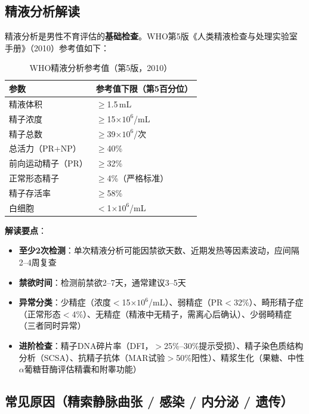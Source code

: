 \subsection{精液分析解读}

精液分析是男性不育评估的\textbf{基础检查}。WHO第5版《人类精液检查与处理实验室手册》（2010）参考值如下：

\begin{table}[htbp]
\centering
\caption{WHO精液分析参考值（第5版，2010）}
\label{tab:semen_analysis_who}
\begin{tabularx}{\textwidth}{@{}lX@{}}
    \toprule
    \textbf{参数} & \textbf{参考值下限（第5百分位）} \\
    \midrule
    精液体积 & $\ge$1.5\,mL \\
    精子浓度 & $\ge$15$\times10^6$/mL \\
    精子总数 & $\ge$39$\times10^6$/次 \\
    总活力（PR+NP） & $\ge$40\% \\
    前向运动精子（PR） & $\ge$32\% \\
    正常形态精子 & $\ge$4\%（严格标准） \\
    精子存活率 & $\ge$58\% \\
    白细胞 & $<$1$\times10^6$/mL \\
    \bottomrule
\end{tabularx}
\end{table}

\textbf{解读要点}：
\begin{itemize}[leftmargin=2cm]
	\item \textbf{至少2次检测}：单次精液分析可能因禁欲天数、近期发热等因素波动，应间隔2--4周复查
	\item \textbf{禁欲时间}：检测前禁欲2--7天，通常建议3--5天
	\item \textbf{异常分类}：少精症（浓度$<$15$\times10^6$/mL）、弱精症（PR$<$32\%）、畸形精子症（正常形态$<$4\%）、无精症（精液中无精子，需离心后确认）、少弱畸精症（三者同时异常）
	\item \textbf{进阶检查}：精子DNA碎片率（DFI，$>$25\%--30\%提示受损）、精子染色质结构分析（SCSA）、抗精子抗体（MAR试验$>$50\%阳性）、精浆生化（果糖、中性$\alpha$葡糖苷酶评估精囊和附睾功能）
\end{itemize}

\subsection{常见原因（精索静脉曲张 / 感染 / 内分泌 / 遗传）}

